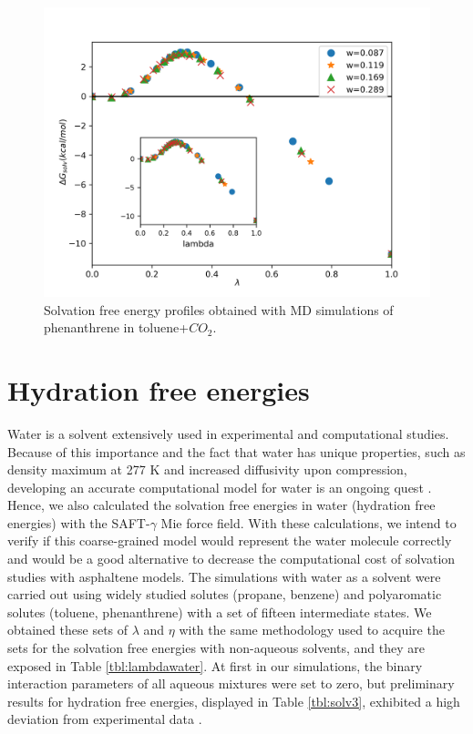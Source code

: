 \begin{figure}[H]
\centering
\includegraphics[width=0.8\linewidth]{Figures/tolco2}
\caption{Solvation free energy profiles obtained with MD simulations of phenanthrene in toluene+$CO_{2}$.}
\label{fig:Figure_1}
\end{figure}


\section{Hydration free energies}

Water is a solvent extensively used in experimental and computational studies. Because of this importance and the fact that water has unique properties, such as density maximum at 277 K and increased diffusivity upon compression, developing an accurate computational model for water is an ongoing quest \cite{hadley2012}. Hence, we also calculated the solvation free energies in water (hydration free energies) with the SAFT-$\gamma$ Mie force field. With these calculations, we intend to verify if this coarse-grained model would represent the water molecule correctly and would be a good alternative to decrease the computational cost of solvation studies with asphaltene models. The simulations with water as a solvent were carried out using widely studied solutes (propane, benzene) and polyaromatic solutes (toluene, phenanthrene) with a set of fifteen intermediate states.  We obtained these sets of $\lambda$ and $\eta$ with the same methodology used to acquire the sets for the solvation free energies with non-aqueous solvents, and they are exposed in Table \ref{tbl:lambdawater}. At first in our simulations, the binary interaction parameters of all aqueous mixtures were set to zero, but preliminary results for hydration free energies, displayed in Table \ref{tbl:solv3},  exhibited a high deviation from experimental data \cite{P29900000291, doi:10.1021/ct050097l}.

